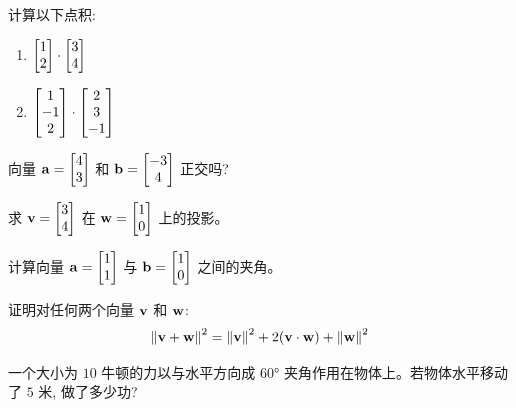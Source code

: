 \begin{exercise}
计算以下点积:
\begin{enumerate}[label=(\alph*)]
    \item $\twovec{1}{2} \cdot \twovec{3}{4}$
    \item $\threevec{1}{-1}{2} \cdot \threevec{2}{3}{-1}$
\end{enumerate}
\end{exercise}

\begin{exercise}
向量 $\va = \twovec{4}{3}$ 和 $\vb = \twovec{-3}{4}$ 正交吗?
\end{exercise}

\begin{exercise}
求 $\vv = \twovec{3}{4}$ 在 $\vw = \twovec{1}{0}$ 上的投影。
\end{exercise}

\begin{exercise}
计算向量 $\va = \twovec{1}{1}$ 与 $\vb = \twovec{1}{0}$ 之间的夹角。
\end{exercise}

\begin{exercise}[挑战]
证明对任何两个向量 $\vv$ 和 $\vw$:
\[
\norm{\vv + \vw}^2 = \norm{\vv}^2 + 2(\vv \cdot \vw) + \norm{\vw}^2
\]
\end{exercise}

\begin{problem}
一个大小为 $10$ 牛顿的力以与水平方向成 $60°$ 夹角作用在物体上。若物体水平移动了 $5$ 米, 做了多少功?
\end{problem}
